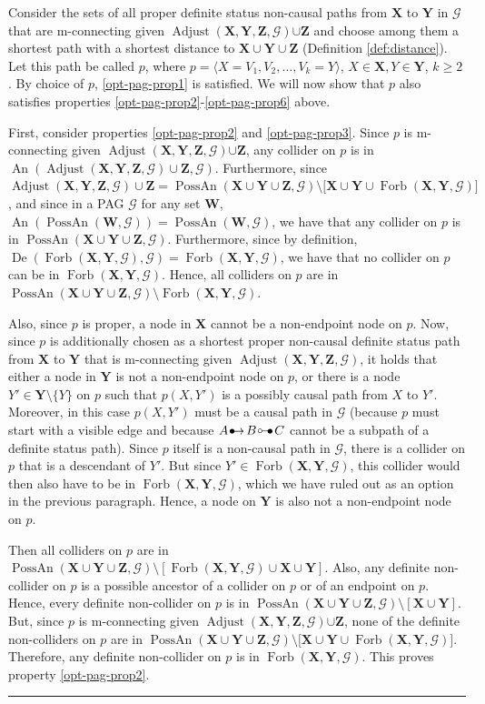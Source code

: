 \documentclass[twoside]{article}
\DeclareMathOperator{\An}{An}
\DeclareMathOperator{\De}{De}
\DeclareMathOperator{\PossAn}{PossAn}
\DeclareMathOperator{\Forb}{Forb}
\newcommand{\fb}[2][X,Y]{\Forb(\mb{#1},#2)}
\DeclareMathOperator{\Adjust}{Adjust}
\newcommand{\adjustb}[2][X,Y,Z]{\Adjust(\mb{#1},#2)}
\newcommand{\mb}[1]{\mathbf{#1}}
\newcommand{\g}[1][G]{\mathcal{#1}}
\newenvironment{proofof}[1][]{\begin{trivlist}
\item[\hskip \labelsep {\bfseries Proof of #1.}]}{\hfill\BlackBox\end{trivlist}}
\newcommand{\BlackBox}{\rule{1.5ex}{1.5ex}}
\newcommand{\circbullet}{
  \setlength{\unitlength}{1mm}
  \begin{picture}(5,1)(0,0)
    \put(1,1){\circle{1}}
    \put(1.5,1){\line(1,0){2.4}}
    \put(2.9,0){$\bullet$}
  \end{picture}
}
\newcommand{\bulletarrow}{
  \setlength{\unitlength}{1mm}
  \begin{picture}(5,1)(0,0)
    \put(0.2,0){$\bullet$}
    \put(1,0){$\rightarrow$}
  \end{picture}
}
\begin{document}
\begin{proofof}[Lemma \ref{lem:adjust-and-o-pag-helper}]
    Consider the sets of all proper definite status non-causal paths from $\mb{X}$ to $\mb{Y}$ in $\g$ that are m-connecting given $\adjustb{\g} {\cup \mb{Z}}$ and choose among them a shortest path with a shortest distance to $\mb{X} \cup \mb{Y} \cup \mb{Z}$ (Definition \ref{def:distance}). Let this path be called $p$, where $p= \langle X = V_1, V_2, \dots, V_k =Y \rangle$, $X \in \mb{X}, Y \in \mb{Y}$, $k \ge 2$. By choice of $p$, \ref{opt-pag-prop1} is satisfied. We will now show that $p$ also satisfies properties \ref{opt-pag-prop2}-\ref{opt-pag-prop6} above. 

    First, consider properties \ref{opt-pag-prop2} and \ref{opt-pag-prop3}. Since $p$ is m-connecting given $\adjustb{\g} {\cup \mb{Z}}$, any collider on $p$ is in $\An(\adjustb{\g} \cup \mb{Z}, \g)$. Furthermore, since $\adjustb{\g} \cup \mb{Z} = \PossAn(\mb{X} \cup \mb{Y} \cup \mb{Z}, \g) \setminus \big[ \mb{X} \cup \mb{Y}  \cup \fb{\g} \big]$, and since in a PAG $\g$ for any set $\mb{W}$, $\An(\PossAn(\mb{W}, \g)) = \PossAn(\mb{W}, \g)$, we have that any collider on $p$ is in $\PossAn(\mb{X} \cup \mb{Y} \cup \mb{Z}, \g)$. Furthermore, since by definition, $\De(\fb{\g}, \g) = \fb{\g}$, we have that no collider on $p$ can be in $\fb{\g}$. Hence, all colliders on $p$ are in $\PossAn(\mb{X} \cup \mb{Y} \cup \mb{Z}, \g) \setminus \fb{\g}.$
    
    
    Also, since $p$ is proper, a node in $\mb{X}$ cannot be a non-endpoint node on $p$. Now, since $p$ is additionally chosen as a shortest proper non-causal definite status path from $\mb{X}$ to $\mb{Y}$ that is m-connecting given $\adjustb{\g}$, it holds that either a node in $\mb{Y}$ is not a non-endpoint node on $p$, or there is a node  $Y' \in \mb{Y} \setminus \{Y\}$ on $p$ such that   $p(X, Y')$ is a possibly causal path from $X$ to $Y'$. Moreover, in this case $p(X,Y')$ must be a causal path in $\g$ (because $p$ must start with a visible edge and because $A \bulletarrow B \circbullet C$ cannot be a subpath of a definite status path). Since $p$ itself is a non-causal path in $\g$, there is a collider on $p$ that is a descendant of $Y'$. But since $Y' \in \fb{\g}$, this collider would then also have to be in $\fb{\g}$, which we have ruled out as an option in the previous paragraph. Hence, a node on $\mb{Y}$ is also not a non-endpoint node on $p.$
    
    Then all colliders on $p$ are in $\PossAn(\mb{X} \cup \mb{Y} \cup \mb{Z}, \g) \setminus [\fb{\g} \cup \mb{X} \cup \mb{Y}]$. Also, any definite non-collider on $p$ is a possible ancestor of a collider on $p$ or of an endpoint on $p$. Hence, every definite non-collider on $p$ is in $\PossAn(\mb{X} \cup \mb{Y} \cup \mb{Z}, \g) \setminus [\mb{X} \cup \mb{Y}].$ But, since $p$ is m-connecting given $\adjustb{\g} {\cup \mb{Z}}$, none of the definite non-colliders on $p$ are in $\PossAn(\mb{X} \cup \mb{Y} \cup \mb{Z} , \g)  \setminus \big[ \mb{X} \cup \mb{Y} \cup \fb{\g} \big]$. Therefore, any definite non-collider on $p$ is in $\fb{\g}$. This proves property \ref{opt-pag-prop2}.


\end{proofof}
\end{document}
